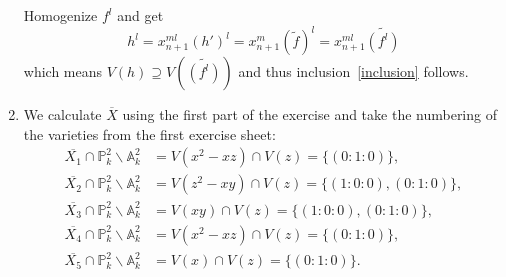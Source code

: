 \begin{exercise}{1}
\begin{enumerate}
            Homogenize $f^l$ and get
            \[
                h^l = x^{ml}_{n+1} (h')^l = x^m_{n+1} (\widetilde{f})^l = 
                x^{ml}_{n+1} \widetilde{(f^l)}
            \]
            which means $V(h) \supseteq V\left(\widetilde{(f^l)}\right)$ and thus
            inclusion~\ref{inclusion} follows.




        \item{} We calculate $\overline{X}$ using the first part of the exercise and take the numbering of the
        varieties from the first exercise sheet:\\
        \begin{align*}
            \overline{X_1}\cap \mathbb{P}^2_k \backslash
            \mathbb{A}^2_k&=V(x^2-xz)\cap V(z)=\{(0:1:0)\},\\
            \overline{X_2}\cap \mathbb{P}^2_k \backslash
            \mathbb{A}^2_k&=V(z^2-xy)\cap V(z)=\{(1:0:0), (0:1:0)\},\\
            \overline{X_3}\cap \mathbb{P}^2_k \backslash
            \mathbb{A}^2_k&=V(xy)\cap V(z)=\{(1:0:0), (0:1:0)\},\\
            \overline{X_4}\cap \mathbb{P}^2_k \backslash
            \mathbb{A}^2_k&=V(x^2-xz)\cap V(z)=\{(0:1:0)\},\\
            \overline{X_5}\cap \mathbb{P}^2_k \backslash
            \mathbb{A}^2_k&=V(x)\cap V(z)= \{(0:1:0)\}.
        \end{align*}


\end{enumerate}
\end{exercise}
